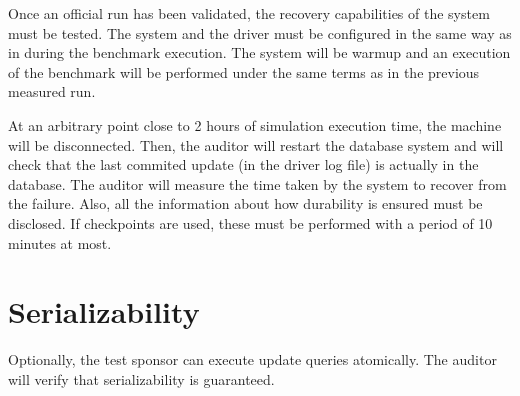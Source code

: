 Once an official run has been validated, the recovery capabilities of the
system must be tested. The system and the driver must be configured in the
same way as in during the benchmark execution. The system will be warmup and an
execution of the benchmark will be performed under the same terms as in the
previous measured run.

At an arbitrary point close to 2 hours of simulation execution time, the machine
will be disconnected.  Then, the auditor will restart the database system and
will check that the last commited update (in the driver log file) is actually
in the database. The auditor will measure the time taken by the system to
recover from the failure. Also, all the information about how durability is 
ensured must be disclosed. If checkpoints are used, these must be performed 
with a period of 10 minutes at most.


\section{Serializability}

Optionally, the test sponsor can execute update queries atomically. The auditor
will verify that serializability is guaranteed. 

